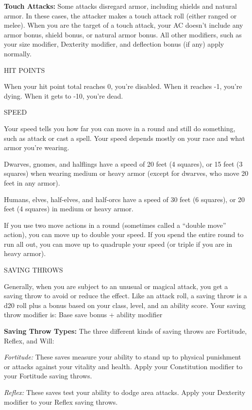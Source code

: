 \documentclass{article}
\begin{document}
\textbf{Touch Attacks:} Some attacks disregard armor, including shields and natural 
armor. In these cases, the attacker makes a touch attack roll (either ranged or 
melee). When you are the target of a touch attack, your AC doesn't include any 
armor bonus, shield bonus, or natural armor bonus. All other modifiers, such as 
your size modifier, Dexterity modifier, and deflection bonus (if any) apply normally.

\vspace{12pt}
HIT POINTS

When your hit point total reaches 0, you're disabled. When it reaches -1, you're 
dying. When it gets to -10, you're dead.

\vspace{12pt}
SPEED

Your speed tells you how far you can move in a round and still do something, such 
as attack or cast a spell. Your speed depends mostly on your race and what armor 
you're wearing.

Dwarves, gnomes, and halflings have a speed of 20 feet (4 squares), or 15 feet 
(3 squares) when wearing medium or heavy armor (except for dwarves, who move 20 
feet in any armor).

Humans, elves, half-elves, and half-orcs have a speed of 30 feet (6 squares), or 
20 feet (4 squares) in medium or heavy armor.

If you use two move actions in a round (sometimes called a ``double move'' action), 
you can move up to double your speed. If you spend the entire round to run all 
out, you can move up to quadruple your speed (or triple if you are in heavy armor).

\vspace{12pt}
SAVING THROWS

Generally, when you are subject to an unusual or magical attack, you get a saving 
throw to avoid or reduce the effect. Like an attack roll, a saving throw is a d20 
roll plus a bonus based on your class, level, and an ability score. Your saving 
throw modifier is: Base save bonus + ability modifier 

\textbf{Saving Throw Types:} The three different kinds of saving throws are Fortitude, 
Reflex, and Will:

\textit{Fortitude: }These saves measure your ability to stand up to physical punishment 
or attacks against your vitality and health. Apply your Constitution modifier to 
your Fortitude saving throws. 

\textit{Reflex: }These saves test your ability to dodge area attacks. Apply your 
Dexterity modifier to your Reflex saving throws. 
\end{document}
